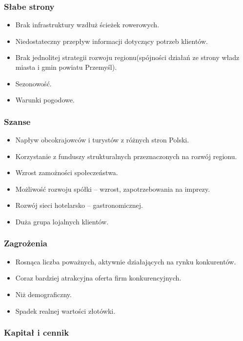 \documentclass{sprawozdanie-agh}
\begin{document}
		\subsubsection{Słabe strony}

		\begin{itemize}
			\item Brak infrastruktury wzdłuż ścieżek rowerowych.
			\item Niedostateczny przepływ informacji dotyczący potrzeb klientów.
			\item Brak jednolitej strategii rozwoju regionu(spójności działań ze strony władz miasta i gmin powiatu Przemyśl).
			\item Sezonowość.
			\item Warunki pogodowe.
		\end{itemize}
		\subsubsection{Szanse}

		\begin{itemize}
			\item Napływ obcokrajowców i turystów z różnych stron Polski.
			\item Korzystanie z funduszy strukturalnych przeznaczonych na rozwój regionu.
			\item Wzrost zamożności społeczeństwa.
			\item Możliwość rozwoju spółki – wzrost, zapotrzebowania na imprezy.
			\item Rozwój sieci hotelarsko – gastronomicznej.
			\item Duża grupa lojalnych klientów.
		\end{itemize}
		\subsubsection{Zagrożenia}

		\begin{itemize}
			\item Rosnąca liczba poważnych, aktywnie działających na rynku konkurentów.
			\item Coraz bardziej atrakcyjna oferta firm konkurencyjnych.
			\item Niż demograficzny.
			\item Spadek realnej wartości złotówki.
		\end{itemize}
		\subsubsection{Kapitał i cennik}
\end{document}
